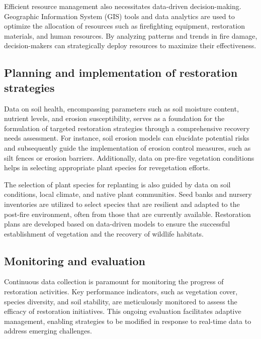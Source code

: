 \documentclass[
  12 pt,
]{Nemilov}
\begin{document}
Efficient resource management also necessitates data-driven decision-making. Geographic Information System (GIS) tools and data analytics are used to optimize the allocation of resources such as firefighting equipment, restoration materials, and human resources. By analyzing patterns and trends in fire damage, decision-makers can strategically deploy resources to maximize their effectiveness.

\subsection{Planning and implementation of restoration strategies}\label{planning-and-implementation-of-restoration-strategies}

Data on soil health, encompassing parameters such as soil moisture content, nutrient levels, and erosion susceptibility, serves as a foundation for the formulation of targeted restoration strategies through a comprehensive recovery needs assessment. For instance, soil erosion models can elucidate potential risks and subsequently guide the implementation of erosion control measures, such as silt fences or erosion barriers. Additionally, data on pre-fire vegetation conditions helps in selecting appropriate plant species for revegetation efforts.

The selection of plant species for replanting is also guided by data on soil conditions, local climate, and native plant communities. Seed banks and nursery inventories are utilized to select species that are resilient and adapted to the post-fire environment, often from those that are currently available. Restoration plans are developed based on data-driven models to ensure the successful establishment of vegetation and the recovery of wildlife habitats.

\subsection{Monitoring and evaluation}\label{monitoring-and-evaluation-1}

Continuous data collection is paramount for monitoring the progress of restoration activities. Key performance indicators, such as vegetation cover, species diversity, and soil stability, are meticulously monitored to assess the efficacy of restoration initiatives. This ongoing evaluation facilitates adaptive management, enabling strategies to be modified in response to real-time data to address emerging challenges.
\end{document}
